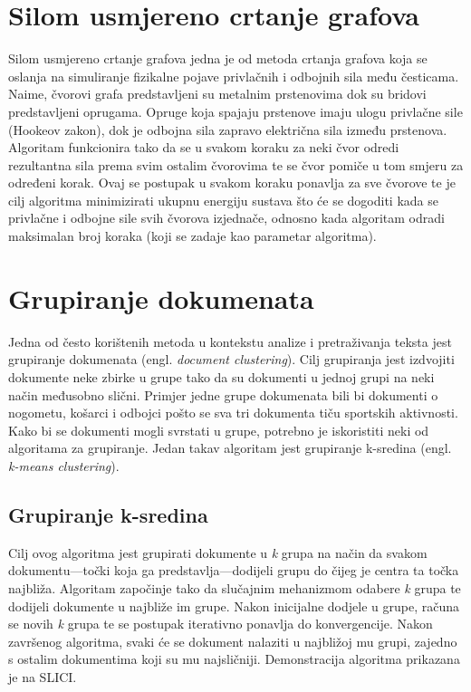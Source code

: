 \documentclass[times, utf8, zavrsni]{fer}
\begin{document}
\section{Silom usmjereno crtanje grafova}
Silom usmjereno crtanje grafova jedna je od metoda crtanja grafova koja se oslanja na simuliranje fizikalne pojave privlačnih i odbojnih sila među česticama. Naime, čvorovi grafa predstavljeni su metalnim prstenovima dok su bridovi predstavljeni oprugama. Opruge koja spajaju prstenove imaju ulogu privlačne sile (Hookeov zakon), dok je odbojna sila zapravo električna sila između prstenova. Algoritam funkcionira tako da se u svakom koraku za neki čvor odredi rezultantna sila prema svim ostalim čvorovima te se čvor pomiče u tom smjeru za određeni korak. Ovaj se postupak u svakom koraku ponavlja za sve čvorove te je cilj algoritma minimizirati ukupnu energiju sustava što će se dogoditi kada se privlačne i odbojne sile svih čvorova izjednače, odnosno kada algoritam odradi maksimalan broj koraka (koji se zadaje kao parametar algoritma).

\section{Grupiranje dokumenata}
Jedna od često korištenih metoda u kontekstu analize i pretraživanja teksta jest grupiranje dokumenata (engl. \textit{document clustering}). Cilj grupiranja jest izdvojiti dokumente neke zbirke u grupe tako da su dokumenti u jednoj grupi na neki način međusobno slični. Primjer jedne grupe dokumenata bili bi dokumenti o nogometu, košarci i odbojci pošto se sva tri dokumenta tiču sportskih aktivnosti. Kako bi se dokumenti mogli svrstati u grupe, potrebno je iskoristiti neki od algoritama za grupiranje. Jedan takav algoritam jest grupiranje k-sredina (engl. \textit{k-means clustering}).

\subsection{Grupiranje k-sredina}
Cilj ovog algoritma jest grupirati dokumente u \textit{k} grupa na način da svakom dokumentu—točki koja ga predstavlja—dodijeli grupu do čijeg je centra ta točka najbliža. Algoritam započinje tako da slučajnim mehanizmom odabere \textit{k} grupa te dodijeli dokumente u najbliže im grupe. Nakon inicijalne dodjele u grupe, računa se novih \textit{k} grupa te se postupak iterativno ponavlja do konvergencije. Nakon završenog algoritma, svaki će se dokument nalaziti u najbližoj mu grupi, zajedno s ostalim dokumentima koji su mu najsličniji. Demonstracija algoritma prikazana je na SLICI.
\end{document}
